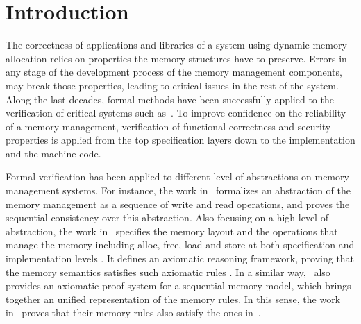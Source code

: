 \section{Introduction}
The correctness of applications and libraries of a system using dynamic memory allocation relies on properties the memory structures have to preserve. Errors in any stage of the development process of the memory management components, may break those properties, leading to critical issues in the rest of the system. Along the last decades, formal methods have been successfully applied to the verification of critical systems such as~\cite{reg_rushby, reg_luu}. To improve confidence on the reliability of a memory management, verification of functional correctness and security properties is applied from the top specification layers down to the implementation and the machine code.

Formal verification has been applied to different level of abstractions on memory management systems. For instance, the work in~\cite{reg_higham} formalizes an abstraction of the memory management as a sequence of write and read operations, and proves the sequential consistency over this abstraction. Also focusing on a high level of abstraction, the work in~\cite{reg_blazy} specifies the memory layout and the operations that manage the memory including alloc, free, load and store at both specification and implementation levels . It defines an axiomatic reasoning framework, proving that the memory semantics satisfies such axiomatic rules   . In a similar way,~\cite{reg_mansky} also provides an axiomatic proof system for a sequential memory model, which brings together an unified representation of the memory rules. In this sense, the work in~\cite{reg_mansky} proves that their memory rules also satisfy the ones in~\cite{reg_blazy}.

